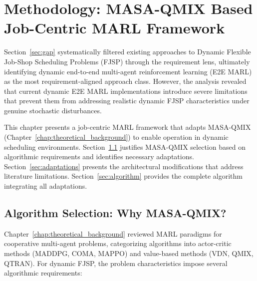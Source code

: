 \chapter{Methodology: MASA-QMIX Based Job-Centric MARL Framework}
\label{chap:methodology}

Section~\ref{sec:gap} systematically filtered existing approaches to Dynamic Flexible Job-Shop Scheduling Problems (FJSP) through the requirement lens, ultimately identifying dynamic end-to-end multi-agent reinforcement learning (E2E MARL) as the most requirement-aligned approach class. However, the analysis revealed that current dynamic E2E MARL implementations introduce severe limitations that prevent them from addressing realistic dynamic FJSP characteristics under genuine stochastic disturbances.

This chapter presents a job-centric MARL framework that adapts MASA-QMIX (Chapter~\ref{chap:theoretical_background}) to enable operation in dynamic scheduling environments. Section~\ref{sec:algorithm_selection} justifies MASA-QMIX selection based on algorithmic requirements and identifies necessary adaptations. Section~\ref{sec:adaptations} presents the architectural modifications that address literature limitations. Section~\ref{sec:algorithm} provides the complete algorithm integrating all adaptations.


\section{Algorithm Selection: Why MASA-QMIX?}
\label{sec:algorithm_selection}

Chapter~\ref{chap:theoretical_background} reviewed MARL paradigms for cooperative multi-agent problems, categorizing algorithms into actor-critic methods (MADDPG, COMA, MAPPO) and value-based methods (VDN, QMIX, QTRAN). For dynamic FJSP, the problem characteristics impose several algorithmic requirements:

